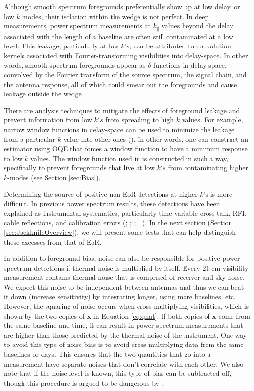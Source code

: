 \documentclass[preprint2,numberedappendix,tighten]{aastex6}  %
\begin{document}
Although smooth spectrum foregrounds preferentially show up at low delay, or low $k$ modes, their isolation within the wedge is not perfect. In deep measurements, power spectrum measurements at $k_{\parallel}$ values beyond 
the delay associated with the length of a baseline are often still contaminated at a low level. This leakage, particularly at low $k$'s, can be attributed to 
convolution kernels associated with Fourier-transforming visibilities into delay-space. In other words, smooth-spectrum 
foregrounds appear as $\delta$-functions in delay-space, convolved by the Fourier transform of the source spectrum, the signal chain, and the 
antenna response, all of which could smear out the foregrounds and cause leakage outside the wedge \citep[e.g.][]{ewall-wice_et_al2017}.

There are analysis techniques to mitigate the effects of foreground leakage and prevent information from low $k's$ from 
spreading to high $k$ values. For example, narrow window functions in delay-space can be used to minimize the leakage from a particular 
$k$ value into other ones (\citealt{liu_et_al2014b}). In other words, one can construct an estimator using OQE that forces a 
window function to have a minimum response to low $k$ values. The window function used in  is constructed in such a way, 
specifically to prevent foregrounds that live at low $k's$ from contaminating higher $k$-modes (see Section \ref{sec:Bias}). 

Determining the source of positive non-EoR detections at higher $k$'s is more difficult. In previous power spectrum results, these detections have been explained as instrumental systematics, particularly time-variable cross talk, RFI, cable reflections, and calibration errors (; \citealt{parsons_et_al2014}; \citealt{dillon_et_al2014}; \citealt{beardsley_et_al2016}; \citealt{patil_et_al2017}). In the next section (Section \ref{sec:JackknifeOverview}), we will present some tests that can help distinguish these excesses from that of EoR. 

In addition to foreground bias, noise can also be responsible for positive power spectrum detections if thermal noise is 
multiplied by itself. Every $21$ cm visibility measurement contains thermal noise that is comprised of receiver and sky noise. 
We expect this noise to be independent between antennas and thus we can beat it down (increase sensitivity) by integrating 
longer, using more baselines, etc. However, the squaring of noise occurs when cross-multiplying visibilities, which is shown by 
the two copies of $\textbf{x}$ in Equation \eqref{eq:qhat}. If both copies of $\textbf{x}$ come from the same baseline and time, it 
can result in power spectrum measurements that are higher than those predicted by the thermal noise of the instrument. One 
way to avoid this type of noise bias is to avoid cross-multiplying data from the same baselines or days. This ensures that the 
two quantities that go into a measurement have separate noises that don't correlate with each other. We also note that if the noise level is known, this type of bias can be subtracted off, though this procedure is argued to be dangerous by \citet{dillon_et_al2014}.
\end{document}
